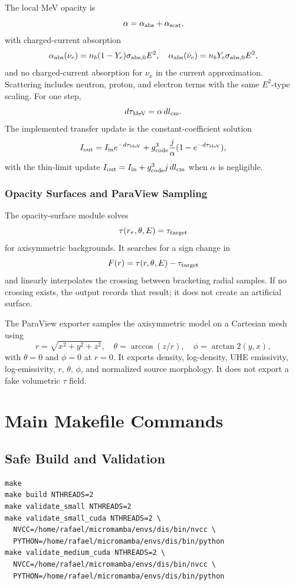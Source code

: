 \documentclass[11pt,a4paper]{article}
\begin{document}
The local MeV opacity is
\[
\alpha=\alpha_{\rm abs}+\alpha_{\rm scat},
\]
with charged-current absorption
\[
\alpha_{\rm abs}(\nu_e)=n_b(1-Y_e)\sigma_{\rm abs,0}E^2,\quad
\alpha_{\rm abs}(\bar{\nu}_e)=n_bY_e\sigma_{\rm abs,0}E^2,
\]
and no charged-current absorption for $\nu_x$ in the current approximation.
Scattering includes neutron, proton, and electron terms with the same
$E^2$-type scaling. For one step,
\[
d\tau_{\rm MeV}=\alpha\,dl_{\rm cm}.
\]
The implemented transfer update is the constant-coefficient solution
\[
I_{\rm out}=I_{\rm in}e^{-d\tau_{\rm MeV}}
 +g_{\rm code}^3{j\over \alpha}(1-e^{-d\tau_{\rm MeV}}),
\]
with the thin-limit update $I_{\rm out}=I_{\rm in}+g_{\rm code}^3j\,dl_{\rm cm}$
when $\alpha$ is negligible.

\subsubsection{Opacity Surfaces and ParaView Sampling}

The opacity-surface module solves
\[
\tau(r_\tau,\theta,E)=\tau_{\rm target}
\]
for axisymmetric backgrounds. It searches for a sign change in
\[
F(r)=\tau(r,\theta,E)-\tau_{\rm target}
\]
and linearly interpolates the crossing between bracketing radial samples. If no
crossing exists, the output records that result; it does not create an
artificial surface.

The ParaView exporter samples the axisymmetric model on a Cartesian mesh using
\[
r=\sqrt{x^2+y^2+z^2},\quad
\theta=\arccos(z/r),\quad
\phi=\arctan2(y,x),
\]
with $\theta=0$ and $\phi=0$ at $r=0$. It exports density, log-density, UHE
emissivity, log-emissivity, $r$, $\theta$, $\phi$, and normalized source
morphology. It does not export a fake volumetric $\tau$ field.

\section{Main Makefile Commands}

\subsection{Safe Build and Validation}

\begin{verbatim}
make
make build NTHREADS=2
make validate_small NTHREADS=2
make validate_small_cuda NTHREADS=2 \
  NVCC=/home/rafael/micromamba/envs/dis/bin/nvcc \
  PYTHON=/home/rafael/micromamba/envs/dis/bin/python
make validate_medium_cuda NTHREADS=2 \
  NVCC=/home/rafael/micromamba/envs/dis/bin/nvcc \
  PYTHON=/home/rafael/micromamba/envs/dis/bin/python
\end{verbatim}
\end{document}
